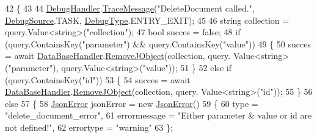 \begin{DoxyCode}
42         \{
43 
44             \mbox{\hyperlink{class_little_weeb_library_1_1_handlers_1_1_debug_handler}{DebugHandler}}.\mbox{\hyperlink{class_little_weeb_library_1_1_handlers_1_1_debug_handler_afccb37dfd6b2114af72000c2f4fe4607}{TraceMessage}}(\textcolor{stringliteral}{"DeleteDocument called."}, 
      \mbox{\hyperlink{namespace_little_weeb_library_1_1_handlers_a2a6ca0775121c9c503d58aa254d292be}{DebugSource}}.TASK, \mbox{\hyperlink{namespace_little_weeb_library_1_1_handlers_ab66019ed40462876ec4e61bb3ccb0a62}{DebugType}}.ENTRY\_EXIT);
45 
46             \textcolor{keywordtype}{string} collection = query.Value<\textcolor{keywordtype}{string}>(\textcolor{stringliteral}{"collection"});
47             \textcolor{keywordtype}{bool} succes = \textcolor{keyword}{false};
48             \textcolor{keywordflow}{if} (query.ContainsKey(\textcolor{stringliteral}{"parameter"}) && query.ContainsKey(\textcolor{stringliteral}{"value"}))
49             \{
50                 succes = await \mbox{\hyperlink{class_little_weeb_library_1_1_handlers_1_1_data_base_handler}{DataBaseHandler}}.\mbox{\hyperlink{class_little_weeb_library_1_1_handlers_1_1_data_base_handler_a7821535a003c7675c09ba846bd9502ca}{RemoveJObject}}(collection, query.
      Value<\textcolor{keywordtype}{string}>(\textcolor{stringliteral}{"parameter"}), query.Value<\textcolor{keywordtype}{string}>(\textcolor{stringliteral}{"value"}));
51             \}
52             \textcolor{keywordflow}{else} \textcolor{keywordflow}{if} (query.ContainsKey(\textcolor{stringliteral}{"id"}))
53             \{
54                 succes = await \mbox{\hyperlink{class_little_weeb_library_1_1_handlers_1_1_data_base_handler}{DataBaseHandler}}.\mbox{\hyperlink{class_little_weeb_library_1_1_handlers_1_1_data_base_handler_a7821535a003c7675c09ba846bd9502ca}{RemoveJObject}}(collection, query.
      Value<\textcolor{keywordtype}{string}>(\textcolor{stringliteral}{"id"}));
55             \}
56             \textcolor{keywordflow}{else}
57             \{
58                 \mbox{\hyperlink{class_little_weeb_library_1_1_models_1_1_json_error}{JsonError}} jsonError = \textcolor{keyword}{new} \mbox{\hyperlink{class_little_weeb_library_1_1_models_1_1_json_error}{JsonError}}()
59                 \{
60                     type = \textcolor{stringliteral}{"delete\_document\_error"},
61                     errormessage = \textcolor{stringliteral}{"Either parameter & value or id are not defined!"},
62                     errortype = \textcolor{stringliteral}{"warning"}
63                 \};

\end{DoxyCode}
